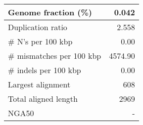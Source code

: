 \documentclass[12pt,a4paper]{article}
\begin{document}
\begin{table}[ht]
\begin{center}
\begin{tabular}{|l*{1}{|r}|}
Genome fraction (\%) & 0.042 \\ \hline
Duplication ratio & 2.558 \\ \hline
\# N's per 100 kbp & 0.00 \\ \hline
\# mismatches per 100 kbp & 4574.90 \\ \hline
\# indels per 100 kbp & 0.00 \\ \hline
Largest alignment & 608 \\ \hline
Total aligned length & 2969 \\ \hline
NGA50 & - \\ \hline
\end{tabular}
\end{center}
\end{table}
\end{document}
